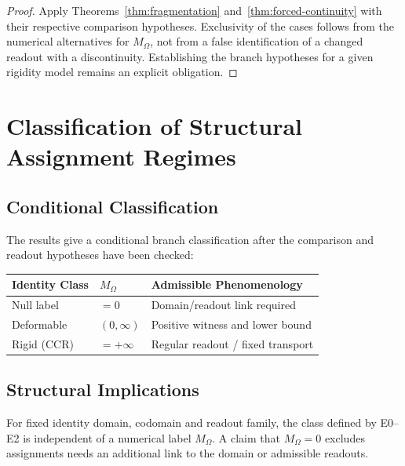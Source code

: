 \begin{proof}
Apply Theorems~\ref{thm:fragmentation} and~\ref{thm:forced-continuity} with their respective comparison hypotheses. Exclusivity of the cases follows from the numerical alternatives for $M_\Omega$, not from a false identification of a changed readout with a discontinuity. Establishing the branch hypotheses for a given rigidity model remains an explicit obligation.
\end{proof}

\section{Classification of Structural Assignment Regimes}

\subsection{Conditional Classification}

The results give a conditional branch classification after the comparison and readout hypotheses have been checked:

\begin{center}
\begin{tabular}{|l|l|l|}
\hline
\textbf{Identity Class} & \textbf{$M_\Omega$} & \textbf{Admissible Phenomenology} \\
\hline
Null label & $= 0$ & Domain/readout link required \\
\hline
Deformable & $(0, \infty)$ & Positive witness and lower bound \\
\hline
Rigid (CCR) & $= +\infty$ & Regular readout / fixed transport \\
\hline
\end{tabular}
\end{center}

\subsection{Structural Implications}

\begin{proposition}
For fixed identity domain, codomain and readout family, the class defined by E0--E2 is independent of a numerical label $M_\Omega$. A claim that $M_\Omega=0$ excludes assignments needs an additional link to the domain or admissible readouts.
\end{proposition}

